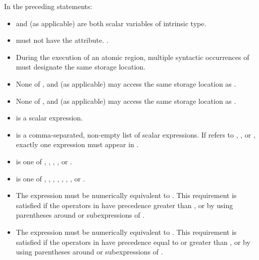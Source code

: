 In the preceding statements:

\begin{itemize}
\item {} and  (as applicable) are both scalar variables of intrinsic type.

\item {} must not have the  attribute. .

\item During the execution of an atomic region, multiple syntactic occurrences of  must 
designate the same storage location.

\item None of ,  and  (as applicable) may access the same storage location as 
. 

\item None of ,  and  (as applicable) may access the same storage location as 
.

\item {} is a scalar expression.

\item {} is a comma-separated, non-empty list of scalar expressions. If 
 refers to , , or , exactly one expression 
must appear in .

\item {} is one of , , , , or .

\item {} is one of \code{+}, \code{*}, \code{-}, \code{/}, , , , or .

\item The expression  must be numerically equivalent to . 
This requirement is satisfied if the operators in  have precedence greater than 
, or by using parentheses around  or subexpressions of .

\item The expression  must be numerically equivalent to . This requirement is satisfied if the operators in  have precedence equal to or 
greater than , or by using parentheses around  or subexpressions of .


\end{itemize}
